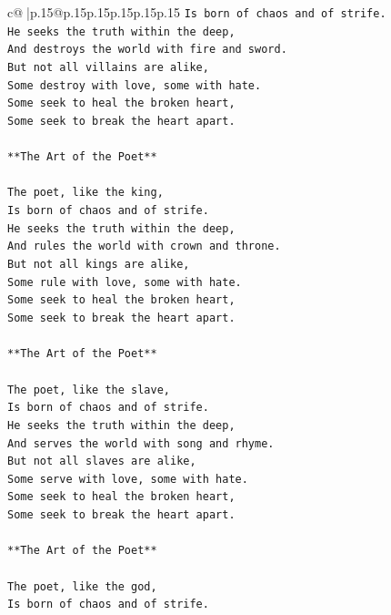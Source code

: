 \documentclass{article}
\begin{document}
{\begin{supertabular}{c@{$\;$}|p{.15\linewidth}@{}p{.15\linewidth}p{.15\linewidth}p{.15\linewidth}p{.15\linewidth}p{.15\linewidth}}
{{{\texttt{Is born of chaos and of strife.} \\
\texttt{He seeks the truth within the deep,} \\
\texttt{And destroys the world with fire and sword.} \\
\texttt{But not all villains are alike,} \\
\texttt{Some destroy with love, some with hate.} \\
\texttt{Some seek to heal the broken heart,} \\
\texttt{Some seek to break the heart apart.} \\
\\ 
\texttt{**The Art of the Poet**} \\
\\ 
\texttt{The poet, like the king,} \\
\texttt{Is born of chaos and of strife.} \\
\texttt{He seeks the truth within the deep,} \\
\texttt{And rules the world with crown and throne.} \\
\texttt{But not all kings are alike,} \\
\texttt{Some rule with love, some with hate.} \\
\texttt{Some seek to heal the broken heart,} \\
\texttt{Some seek to break the heart apart.} \\
\\ 
\texttt{**The Art of the Poet**} \\
\\ 
\texttt{The poet, like the slave,} \\
\texttt{Is born of chaos and of strife.} \\
\texttt{He seeks the truth within the deep,} \\
\texttt{And serves the world with song and rhyme.} \\
\texttt{But not all slaves are alike,} \\
\texttt{Some serve with love, some with hate.} \\
\texttt{Some seek to heal the broken heart,} \\
\texttt{Some seek to break the heart apart.} \\
\\ 
\texttt{**The Art of the Poet**} \\
\\ 
\texttt{The poet, like the god,} \\
\texttt{Is born of chaos and of strife.} \\
}}}
\end{supertabular}}
\end{document}
